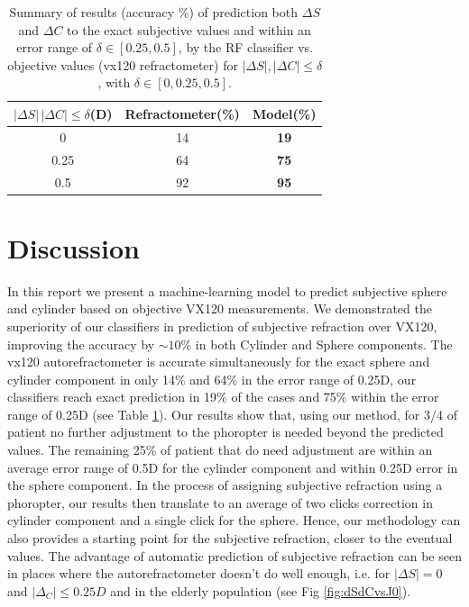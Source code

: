 \documentclass[article,twocolumn,preprint,10pt]{paper}%
\renewcommand{\(}{\left(}
\renewcommand{\)}{\right)}
\renewcommand{\[}{\left[}
\renewcommand{\]}{\right]}
\newcommand{\1}{\mbox{\boldmath$1$}}
\begin{document}
	\begin{table}
		\begin{tabular}{c|c|c|}
			$|\Delta S|\,|\Delta C|\leq\delta$(D) & Refractometer(\%) & Model(\%)\\
			\hline 
			0              & 14 & \textbf{19} \\
			0.25         & 64 & \textbf{75} \\
			0.5           & 92 & \textbf{95} \\
		\end{tabular}
		\caption{Summary of results (accuracy \%) of prediction both $\Delta S$ and $\Delta C$  to the exact subjective values and within an error range of $\delta \in[0.25,0.5]$, by the RF classifier vs. objective values (vx120 refractometer) for $|\Delta S|, |\Delta C|\leq \delta$, with $\delta\in[0,0.25,0.5]$.}
		\label{table:resultsSphereAndCylinderDelta}
	\end{table}
	
	\section{Discussion}
	In this report we present a machine-learning model to predict subjective sphere and cylinder based on objective VX120 measurements. We demonstrated the superiority of our classifiers in prediction of subjective refraction over VX120, improving the accuracy by $\sim10\%$ in both Cylinder and Sphere components. The vx120 autorefractometer is accurate simultaneously for the exact sphere and cylinder component in only 14\%  and 64\% in the error range of 0.25D, our classifiers reach exact prediction in 19\% of the cases and 75\% within the error range of 0.25D (see Table \ref{table:resultsSphereAndCylinderDelta}). Our results show that, using our method, for 3/4 of patient no further adjustment to the phoropter is needed beyond the predicted values. The remaining 25\% of patient that do need adjustment are within an average error range of 0.5D  for the cylinder component and within 0.25D error in the sphere component. In the process of assigning subjective refraction using a phoropter, our results then translate  to an average of two clicks correction in cylinder component and a single click for the sphere. Hence, our methodology can also provides a starting point for the subjective refraction, closer to the eventual values.  The advantage of automatic prediction of subjective refraction can be seen in places where the autorefractometer doesn't do well enough, i.e. for $|\Delta S|=0$ and $|\Delta_C|\leq 0.25D$ and in the elderly population (see Fig \ref{fig:dSdCvsJ0}).
	
\end{document}
